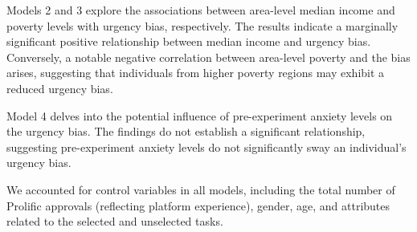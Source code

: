 \documentclass[
]{article}
\begin{document}
Models 2 and 3 explore the associations between area-level median income
and poverty levels with urgency bias, respectively. The results indicate
a marginally significant positive relationship between median income and
urgency bias. Conversely, a notable negative correlation between
area-level poverty and the bias arises, suggesting that individuals from
higher poverty regions may exhibit a reduced urgency bias.

Model 4 delves into the potential influence of pre-experiment anxiety
levels on the urgency bias. The findings do not establish a significant
relationship, suggesting pre-experiment anxiety levels do not
significantly sway an individual's urgency bias.

We accounted for control variables in all models, including the total
number of Prolific approvals (reflecting platform experience), gender,
age, and attributes related to the selected and unselected tasks.
\end{document}
